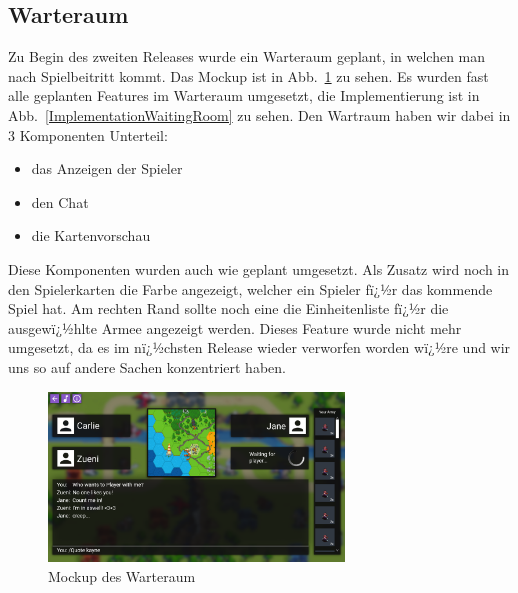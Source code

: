 \documentclass[12pt, titlepage]{scrartcl}
\newcommand{\Abb}[1]{%
	Abb.\ \ref{#1}%
}
\begin{document}
			\subsection{Warteraum}
			Zu Begin des zweiten Releases wurde ein Warteraum geplant, in welchen man nach Spielbeitritt kommt. Das Mockup ist in \Abb{MockupWaitingRoom} zu sehen. Es wurden fast alle geplanten Features im Warteraum umgesetzt, die Implementierung ist in \Abb{ImplementationWaitingRoom} zu sehen. Den Wartraum haben wir dabei in 3 Komponenten Unterteil:
			\begin{itemize}
				\item das Anzeigen der Spieler
				\item den Chat
				\item die Kartenvorschau
			\end{itemize}
			Diese Komponenten wurden auch wie geplant umgesetzt. Als Zusatz wird noch in den Spielerkarten die Farbe angezeigt, welcher ein Spieler fï¿½r das kommende Spiel hat. Am rechten Rand sollte noch eine die Einheitenliste fï¿½r die ausgewï¿½hlte Armee angezeigt werden. Dieses Feature wurde nicht mehr umgesetzt, da es im nï¿½chsten Release wieder verworfen worden wï¿½re und wir uns so auf andere Sachen konzentriert haben.
			\begin{figure}[H] 
				\centering
				\includegraphics[width=0.7\textwidth]{Waiting_Room_Game_mit_ArmyView.png}
				\caption{Mockup des Warteraum}
				\label{MockupWaitingRoom}
			\end{figure}
			
\end{document}
